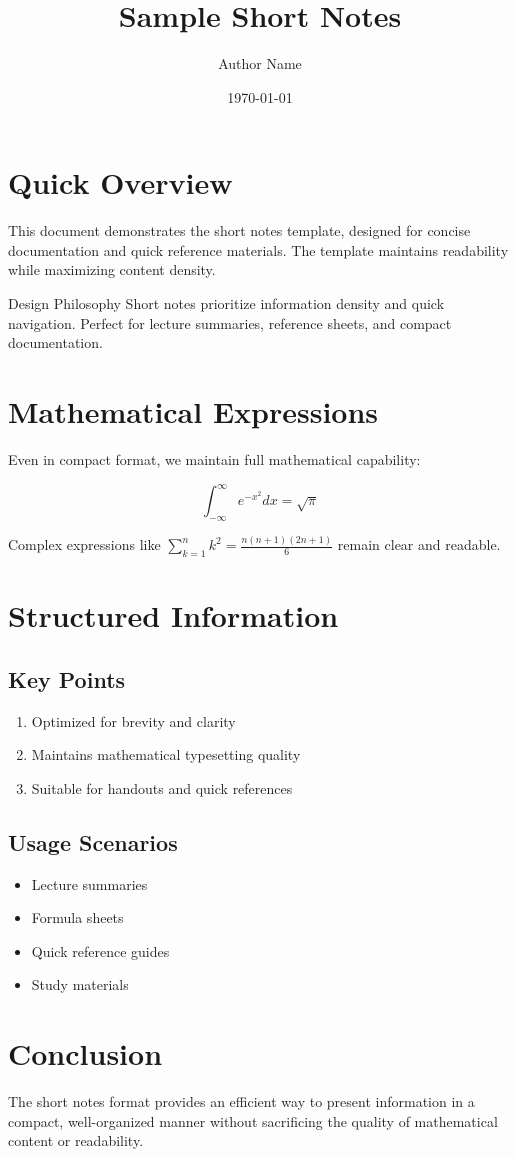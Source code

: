 \documentclass{e_class_noteShort}
\title{Sample Short Notes}
\author{Author Name}
\date{\today}
\begin{document}
\maketitle
\mytoc

\section{Quick Overview}

This document demonstrates the short notes template, designed for concise documentation and quick reference materials. The template maintains readability while maximizing content density.

\begin{special_columns}{Design Philosophy}
    Short notes prioritize information density and quick navigation. Perfect for lecture summaries, reference sheets, and compact documentation.
\end{special_columns}

\section{Mathematical Expressions}

Even in compact format, we maintain full mathematical capability:

$$\int_{-\infty}^{\infty} e^{-x^2} dx = \sqrt{\pi}$$

Complex expressions like $\sum_{k=1}^{n} k^2 = \frac{n(n+1)(2n+1)}{6}$ remain clear and readable.

\section{Structured Information}

\subsection{Key Points}
\begin{enumerate}
    \item Optimized for brevity and clarity
    \item Maintains mathematical typesetting quality
    \item Suitable for handouts and quick references
\end{enumerate}

\subsection{Usage Scenarios}
\begin{itemize}
    \item Lecture summaries
    \item Formula sheets
    \item Quick reference guides
    \item Study materials
\end{itemize}

\section{Conclusion}

The short notes format provides an efficient way to present information in a compact, well-organized manner without sacrificing the quality of mathematical content or readability.
\end{document}
